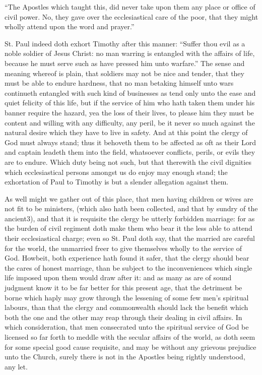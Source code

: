 “The Apostles which taught this, did never take upon them any place or office of civil power. No, they gave over the ecclesiastical care of the poor, that they might wholly attend upon the word and prayer.”

St. Paul indeed doth exhort Timothy after this manner: “Suffer thou evil as a noble soldier of Jesus Christ: no man warring is entangled with the affairs of life, because he must serve such as have pressed him unto warfare.” The sense and meaning whereof is plain, that soldiers may not be nice and tender, that they must be able to endure hardness, that no man betaking himself unto wars continueth entangled with such kind of businesses as tend only unto the ease and quiet felicity of this life, but if the service of him who hath taken them under his banner require the hazard, yea the loss of their lives, to please him they must be content and willing with any difficulty, any peril, be it never so much against the natural desire which they have to live in safety. And at this point the clergy of God must always stand; thus it behoveth them to be affected as oft as their Lord and captain leadeth them into the field, whatsoever conflicts, perils, or evils they are to endure. Which duty being not such, but that therewith the civil dignities which ecclesiastical persons amongst us do enjoy may enough stand; the exhortation of Paul to Timothy is but a slender allegation against them.

As well might we gather out of this place, that men having children or wives are not fit to be ministers, (which also hath been collected, and that by sundry of the ancient3), and that it is requisite the clergy be utterly forbidden marriage: for as  the burden of civil regiment doth make them who bear it the less able to attend their ecclesiastical charge; even so St. Paul doth say, that the married are careful for the world, the unmarried freer to give themselves wholly to the service of God. Howbeit, both experience hath found it safer, that the clergy should bear the cares of honest marriage, than be subject to the inconveniences which single life imposed upon them would draw after it: and as many as are of sound judgment know it to be far better for this present age, that the detriment be borne which haply may grow through the lessening of some few men’s spiritual labours, than that the clergy and commonwealth should lack the benefit which both the one and the other may reap through their dealing in civil affairs. In which consideration, that men consecrated unto the spiritual service of God be licensed so far forth to meddle with the secular affairs of the world, as doth seem for some special good cause requisite, and may be without any grievous prejudice unto the Church, surely there is not in the Apostles being rightly understood, any let.

